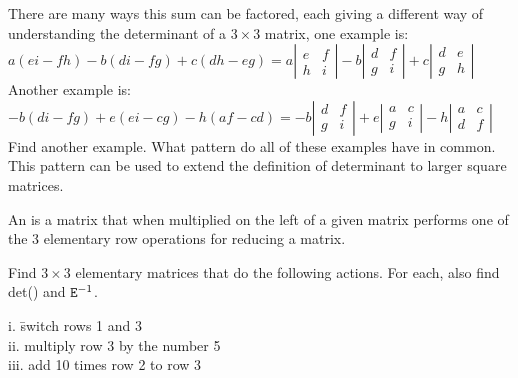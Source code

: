 \noindent {} There are many ways this sum can be factored, each giving a different way of understanding the determinant of a $3 \times 3$ matrix, one example is:\\
$a(ei-fh)-b(di-fg)+c(dh-eg) = a\left| \begin{array}{cc}e&f\\h&i \end{array} \right|-b\left| \begin{array}{cc}d&f\\g&i \end{array} \right| +c\left| \begin{array}{cc}d&e\\g&h \end{array} \right| $\\
Another example is: \\
$-b(di-fg) + e(ei-cg) - h(af-cd) = -b\left| \begin{array}{cc}d&f\\g&i \end{array} \right| + e\left| \begin{array}{cc}a&c\\g&i \end{array} \right| -h\left| \begin{array}{cc}a&c\\d&f \end{array} \right| $\\
Find another example. What pattern do all of these examples have in common. This pattern can be used to extend the definition of determinant to larger square matrices. 


\begin{defn}
	An  is a matrix that when multiplied on the left of a given matrix performs one of the 3 elementary row operations for reducing a matrix.
\end{defn}
 
\begin{myexa}[\bd{a}]
	Find $3 \times 3$ elementary matrices   that do the following actions. For each, also find  det()  and $\texttt{E}^{-1} $.
	\begin{tabbing}
		\indent i. \quad \= switch rows 1 and 3\\
		\indent ii.  \> multiply row 3 by the number 5 \\
		\indent iii. \> add 10 times row 2 to row 3
	\end{tabbing}
\end{myexa}

